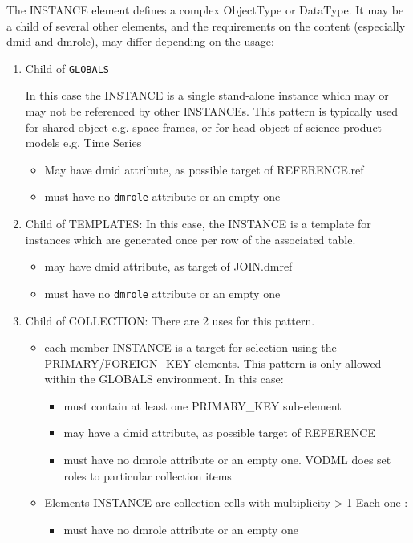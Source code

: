 The INSTANCE element defines a complex ObjectType or DataType.
It may be a child of several other elements, and the requirements on
the content (especially dmid and dmrole), may differ depending on
the usage:


\begin{enumerate}
\item Child of \texttt{GLOBALS}

   In this case the INSTANCE is a single stand-alone instance which
   may or may not be referenced by other INSTANCEs. This pattern is typically used for 
   shared object e.g. space frames, or for head object of science product models e.g. Time Series
  \begin{itemize}
     \item May have dmid attribute, as possible target of REFERENCE.ref
     \item must have no  \texttt{dmrole} attribute or an empty one
  \end{itemize}  
     
\item Child of TEMPLATES:
  In this case, the INSTANCE is a template for instances which
  are generated once per row of the associated table.  
  \begin{itemize}
     \item may have dmid attribute, as target of JOIN.dmref
     \item must have no  \texttt{dmrole} attribute or an empty one
  \end{itemize}  

\item Child of COLLECTION:
  There are 2 uses for this pattern.  
  \begin{itemize}
     \item each member INSTANCE is a target for selection using
           the PRIMARY/FOREIGN\_KEY elements. This pattern is only 
           allowed within the GLOBALS environment. In this case:             
           \begin{itemize}
             \item must contain at least one PRIMARY\_KEY sub-element
             \item may have a dmid attribute, as possible target of REFERENCE
             \item must have no  dmrole attribute or an empty one. VODML does set roles to particular collection items
           \end{itemize}

     \item Elements INSTANCE are collection cells with multiplicity > 1
          Each one :             
           \begin{itemize}
             \item must have no dmrole attribute or an empty one
           \end{itemize}
  \end{itemize}  
    

\end{enumerate}
